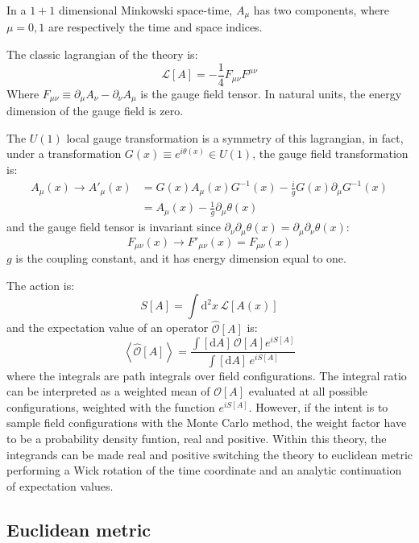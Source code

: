 In a $1+1$ dimensional Minkowski space-time, $A_\mu$ has two components, where $\mu = 0, 1$ are respectively the time and space indices.

The classic lagrangian of the theory is:
\[
    \mathcal L[A] = -\frac{1}{4} F_{\mu\nu}F^{\mu\nu}
\]
Where $F_{\mu\nu} \equiv \partial_\mu A_\nu - \partial_\nu A_\mu$ is the gauge field tensor.
In natural units, the energy dimension of the gauge field is zero.

The $U(1)$ local gauge transformation is a symmetry of this lagrangian, in fact,
under a transformation $G(x) \equiv e^{i\theta(x)} \in U(1)$,
the gauge field transformation is:
\begin{align*}
    A_\mu(x) \rightarrow A'_\mu(x) &= G(x) A_\mu(x) G^{-1}(x) - \frac{i}{g} G(x) \partial_\mu G^{-1}(x) \\
                                   &= A_\mu(x) - \frac{1}{g} \partial_\mu \theta(x)
\end{align*}
and the gauge field tensor is invariant since $\partial_\nu\partial_\mu\theta(x) = \partial_\mu\partial_\nu\theta(x)$:
\[
    F_{\mu\nu}(x) \rightarrow F'_{\mu\nu}(x) = F_{\mu\nu}(x)
\]
$g$ is the coupling constant, and it has energy dimension equal to one.

The action is: \[ S[A] = \int \mathrm d^2x\, \mathcal L[A(x)] \] and the expectation value of an operator $\widehat{\mathcal O}[A]$ is:
\[
    \left< \widehat{\mathcal O}[A] \right> = \frac{\int[\mathrm dA]\, \mathcal O[A] e^{iS[A]}}{\int[\mathrm dA]\,e^{iS[A]}}
\]
where the integrals are path integrals over field configurations.
The integral ratio can be interpreted as a weighted mean of $\mathcal O[A]$ evaluated at all possible configurations, weighted with the function $e^{iS[A]}$.
However, if the intent is to sample field configurations with the Monte Carlo method, the weight factor have to be a probability density funtion, \ie real and positive.
Within this theory, the integrands can be made real and positive
switching the theory to euclidean metric performing a Wick rotation of the time coordinate and an analytic continuation of expectation values.

\subsection*{Euclidean metric}


